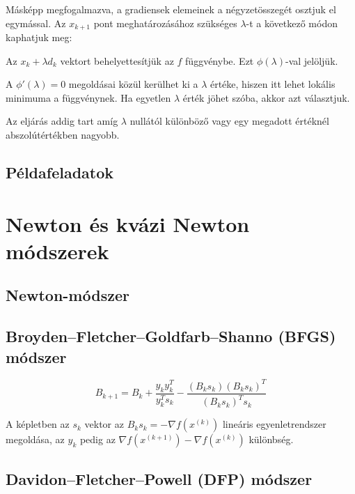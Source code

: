 \documentclass[a4paper,12pt,svgnames]{report}
\begin{document}
\begin{multicols}{2}
Másképp megfogalmazva, a gradiensek elemeinek a négyzetösszegét osztjuk el egymással. Az $x_{k+1}$ pont meghatározásához szükséges $\lambda$-t a következő módon kaphatjuk meg:

\begin{numericlist}
\item Az $x_k+\lambda d_k$ vektort behelyettesítjük az $f$ függvénybe. Ezt $\phi(\lambda)$-val jelöljük.
\item A $\phi'(\lambda)=0$ megoldásai közül kerülhet ki a $\lambda$ értéke, hiszen itt lehet lokális minimuma a függvénynek. Ha egyetlen $\lambda$ érték jöhet szóba, akkor azt választjuk.
\item Az eljárás addig tart amíg $\lambda$ nullától különböző vagy egy megadott értéknél abszolútértékben nagyobb.
\end{numericlist}

\subsection{Példafeladatok}





\section{Newton és kvázi Newton módszerek}

\subsection{Newton-módszer}

\subsection{Broyden--Fletcher--Goldfarb--Shanno (BFGS) módszer}

$$B_{k+1}=B_k+\frac{y_ky_k^T}{y_k^Ts_k}-\frac{(B_ks_k)(B_ks_k)^T}{(B_ks_k)^Ts_k}$$

A képletben az $s_k$ vektor az $B_ks_k=-\nabla f(x^{(k)})$ lineáris egyenletrendszer megoldása, az $y_k$ pedig az $\nabla f(x^{(k+1)})-\nabla f(x^{(k)})$ különbség.

\subsection{Davidon--Fletcher--Powell (DFP) módszer}


\end{multicols}
\end{document}
